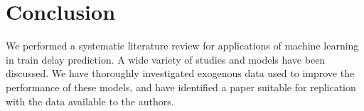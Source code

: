 \documentclass{article}
\begin{document}
\section{Conclusion}

We performed a systematic literature review for applications of machine learning in train delay prediction. A wide variety of studies and models have been discussed. We have thoroughly investigated exogenous data used to improve the performance of these models, and have identified a paper suitable for replication with the data available to the authors.

\printbibliography
 
\end{document}
